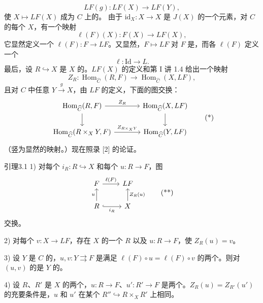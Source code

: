 \[LF(g):LF(X)\longrightarrow LF(Y),\]
使 $X\mapsto LF(X)$ 成为 $C$ 上的。
由于 $\mathrm{id}_X:X\to X$ 是 $J(X)$ 的一个元素，对 $C$ 的每个 $X$，有一个映射
\[\ell(F)(X):F(X)\longrightarrow LF(X),\]
它显然定义一个 $\ell(F):F\to LF$。又显然，$F\mapsto LF$ 对 $F$ 是，而各 $\ell(F)$ 定义一个
\[\ell:\mathrm{Id}\longrightarrow L.\]
最后，设 $R\hookrightarrow X$ 是 $X$ 的。$LF(X)$ 的定义和第 I 讲 1.4 给出一个映射
\[Z_R:\operatorname{Hom}_{\widehat C}(R,F)\longrightarrow\operatorname{Hom}_{\widehat C}(X,LF),\]
且对 $C$ 中任意 $Y\xrightarrow{g}X$，由 $LF$ 的定义，下面的图交换：
\[
\begin{tikzcd}[column sep=large]
\operatorname{Hom}_{\widehat C}(R,F)\arrow[r,"Z_R"]\arrow[d]&\operatorname{Hom}_{\widehat C}(X,LF)\arrow[d]\\
\operatorname{Hom}_{\widehat C}(R\times_XY,F)\arrow[r,"Z_{R\times_XY}"]&\operatorname{Hom}_{\widehat C}(Y,LF)
\end{tikzcd}\tag{*}
\]
（竖为显然的映射。）现在照录 [2] 的论证。
\begin{SGAresult}{引理}{3.1}
1) 对每个 $i_R:R\hookrightarrow X$ 和每个 $u:R\to F$，图
\[
\begin{tikzcd}
F\arrow[r,"\ell(F)"]&LF\\
R\arrow[u,"u"]\arrow[r,hook,"i_R"']&X\arrow[u,"Z_R(u)"']
\end{tikzcd}\tag{**}
\]
交换。
\par 2) 对每个 $v:X\to LF$，存在 $X$ 的一个 $R$ 以及 $u:R\to F$，使 $Z_R(u)=v$。
\par 3) 设 $Y$ 是 $C$ 的，$u,v:Y\rightrightarrows F$ 是满足 $\ell(F)\circ u=\ell(F)\circ v$ 的两个。则对 $(u,v)$ 的是 $Y$ 的。
\par 4) 设 $R$、$R'$ 是 $X$ 的两个，$u:R\to F$、$u':R'\to F$ 是两个。$Z_R(u)=Z_{R'}(u')$ 的充要条件是，$u$ 和 $u'$ 在某个 $R''\hookrightarrow R\times_XR'$ 上相同。
\end{SGAresult}
